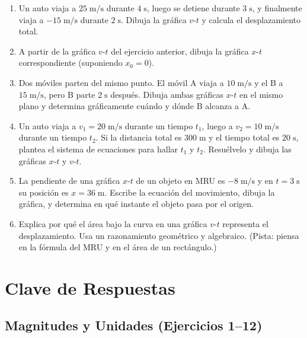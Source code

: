 \documentclass[12pt, letterpaper]{article}
\begin{document}
\begin{enumerate}[leftmargin=*, resume]
  \item \medio{} Un auto viaja a $25\;\text{m/s}$ durante $4\;\text{s}$, luego se detiene durante $3\;\text{s}$, y finalmente viaja a $-15\;\text{m/s}$ durante $2\;\text{s}$. Dibuja la gráfica $v$-$t$ y calcula el desplazamiento total.

  \item \medio{} A partir de la gráfica $v$-$t$ del ejercicio anterior, dibuja la gráfica $x$-$t$ correspondiente (suponiendo $x_0 = 0$).

  \item \dificil{} Dos móviles parten del mismo punto. El móvil A viaja a $10\;\text{m/s}$ y el B a $15\;\text{m/s}$, pero B parte $2\;\text{s}$ después. Dibuja ambas gráficas $x$-$t$ en el mismo plano y determina gráficamente cuándo y dónde B alcanza a A.

  \item \dificil{} Un auto viaja a $v_1 = 20\;\text{m/s}$ durante un tiempo $t_1$, luego a $v_2 = 10\;\text{m/s}$ durante un tiempo $t_2$. Si la distancia total es $300\;\text{m}$ y el tiempo total es $20\;\text{s}$, plantea el sistema de ecuaciones para hallar $t_1$ y $t_2$. Resuélvelo y dibuja las gráficas $x$-$t$ y $v$-$t$.

  \item \dificil{} La pendiente de una gráfica $x$-$t$ de un objeto en MRU es $-8\;\text{m/s}$ y en $t = 3\;\text{s}$ su posición es $x = 36\;\text{m}$. Escribe la ecuación del movimiento, dibuja la gráfica, y determina en qué instante el objeto pasa por el origen.

  \item \dificil{} Explica por qué el área bajo la curva en una gráfica $v$-$t$ representa el desplazamiento. Usa un razonamiento geométrico y algebraico. (Pista: piensa en la fórmula del MRU y en el área de un rectángulo.)
\end{enumerate}

\newpage

\ifmwclaves
  \section{Clave de Respuestas}

  \subsection*{Magnitudes y Unidades (Ejercicios 1--12)}
\end{document}
